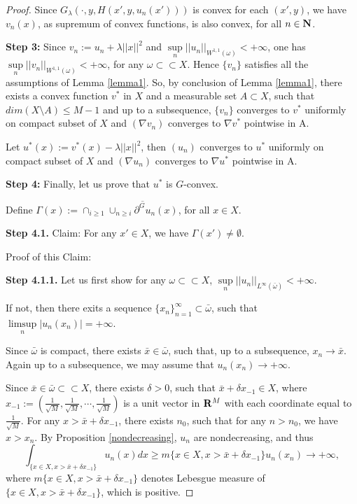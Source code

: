 \begin{proof}
	
	Since $G_{\lambda}(\cdot,y,H(x',y,u_n(x')))$ is convex for each $(x', y)$, we have $v_n(x)$, as supremum of convex functions, is also convex, for all $n \in \mathbf{N}$.\medskip
	
	
	
	{\bf Step 3:}	Since $v_n:= u_n +\lambda||x||^2$ and $\sup\limits_{n}||u_n||_{W^{1,1}(\omega)} < +\infty$, one has $\sup\limits_{n}||v_n||_{W^{1,1}(\omega)} < +\infty$, for any $\omega \subset \subset X$. Hence $\{v_n\}$ satisfies all the assumptions of Lemma \ref{lemma1}. So, by conclusion of Lemma \ref{lemma1}, there exists a convex function $v^*$ in $X$ and a measurable set $A \subset X$, such that $dim (X \setminus A)\le M-1$ and up to a subsequence, $\{v_n\}$ converges to $v^*$ uniformly on compact subset of $X$ and $(\nabla v_n)$ converges to $\nabla v^*$ pointwise in A.
	
	Let $u^*(x):=v^*(x)-\lambda||x||^2$, then  $(u_n)$ converges to $u^*$ uniformly on compact subset of $X$ and $(\nabla u_n)$ converges to $\nabla u^*$ pointwise in A.\medskip
	
	{\bf Step 4:}	Finally, let us prove that $u^*$ is $G$-convex.\medskip
	
	Define $\Gamma(x):=\cap_{i\ge 1}\overline{\cup_{n\ge i}\partial^G u_n(x)}$, for all $x\in X$.\medskip

	
	{\bf	Step 4.1.} Claim: For any $x'\in X$, we have $\Gamma(x') \neq \emptyset$.
	
	Proof of this Claim: 
	
	{\bf Step 4.1.1.} Let us first show for any $\omega \subset\subset X$, $\sup\limits_{n}||u_n||_{L^{\infty}(\bar{\omega})}<+\infty$.
	
	If not, then there exits a sequence $\{x_n\}_{n=1}^{\infty}\subset \bar{\omega}$, such that $\limsup\limits_{n}|u_n(x_n)|=+\infty$.
	
	Since $\bar{\omega}$ is compact, there exists $\bar{x}\in \bar{\omega}$, such that, up to a subsequence, $x_n\rightarrow \bar{x}$. Again up to a subsequence, we may assume that $u_n(x_n)\rightarrow +\infty$.
	
	Since $\bar{x} \in \bar{\omega} \subset \subset X$, there exists $\delta >0$, such that $\bar{x}+\delta x_{-1} \in X$, where $x_{-1}:=(\frac{1}{\sqrt{M}}, \frac{1}{\sqrt{M}}, \cdots, \frac{1}{\sqrt{M}})$ is a unit vector in ${\mathbf R}^M$ with each coordinate equal to $\frac{1}{\sqrt{M}}$. For any $x>\bar{x} + \delta x_{-1}$, there exists $n_0$, such that for any $n>n_0$, we have $x>x_n$. By Proposition \ref{nondecreasing}, $u_n$ are nondecreasing, and thus
	\begin{equation}\label{eqn_integral}
	\int_{\{x\in X, x>\bar{x} +\delta x_{-1}\}} u_n(x)dx \ge m\{x\in X, x> \bar{x}+\delta x_{-1}\} u_n(x_n)\rightarrow +\infty,
	\end{equation}
	where $m\{x\in X, x>\bar{x}+\delta x_{-1}\}$ denotes Lebesgue measure of $\{x\in X, x>\bar{x}+\delta x_{-1}\}$, which is positive.
	

\end{proof}

